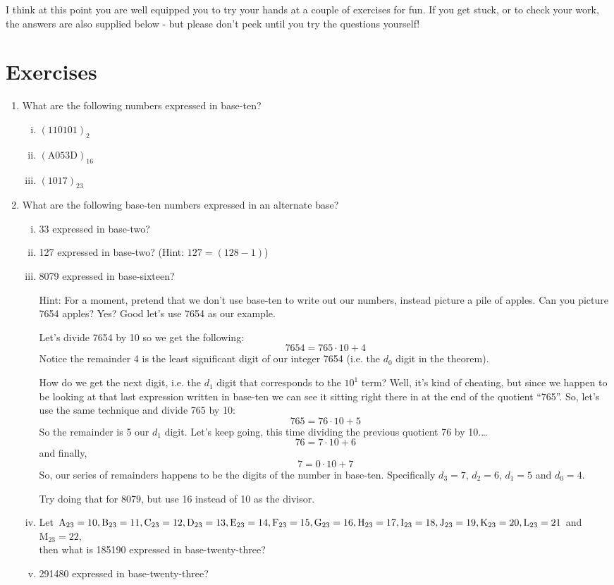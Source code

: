 \documentclass{article}
\begin{document}
I think at this point you are well equipped you to try
your hands at a couple of exercises for fun. If you get stuck, or to
check your work, the
answers are also supplied below - but please don't peek until you try the questions yourself!

\section*{Exercises}
\begin{enumerate}
\item What are the following numbers expressed in base-ten?
\begin{enumerate}[i)]
\item $(110101)_2$
\item $(\text{A}053\text{D})_{16}$
\item $(1017)_{23}$
\end{enumerate}
\item What are the following base-ten numbers expressed in an alternate base?
\begin{enumerate}[i)]
\item 33 expressed in base-two?
\item 127 expressed in base-two? (Hint: $127 = (128-1)$)
\item 8079 expressed in base-sixteen?

Hint: For a moment, pretend that we don't use base-ten to
write out our numbers, instead picture a pile of apples.
Can you picture 7654 apples?  Yes?  Good let's use 7654 as our example.

Let's divide 7654 by 10 so we get the following:
\[7654 = 765\cdot{}10+4\]
Notice the remainder 4 is the least significant digit of our
integer 7654  (i.e. the $d_0$ digit in the theorem).

How do we get the next digit, i.e. the $d_1$ digit that corresponds to the $10^1$ term? Well, it’s kind of cheating, but
since we happen to be looking at that last expression written in
base-ten we can see it sitting right there in at the
end of the quotient ``765''. So, let's use the same technique and divide 765 by 10:
\[765 = 76\cdot{}10+5\]
So the remainder is 5 our $d_1$ digit.  Let's keep going, this time dividing the previous quotient 76 by 10.\dots	
\[76 = 7\cdot{}10+6\]
and finally,
\[7= 0\cdot{}10+7\]
So, our series of remainders happens to be the digits of the number in base-ten.
Specifically $d_3 = 7$, $d_2=6$, $d_1=5$ and $d_0=4$.

Try doing that for 8079, but use 16 instead of 10 as the divisor.
\item Let $\text{A}_{23} = 10, \text{B}_{23} = 11, \text{C}_{23} = 12, \text{D}_{23} = 13, \text{E}_{23} = 14, \text{F}_{23} = 15,
\text{G}_{23} = 16,\\
\text{H}_{23} = 17, \text{I}_{23} = 18, \text{J}_{23} = 19, \text{K}_{23} = 20, \text{L}_{23} = 21$ and $\text{M}_{23} = 22$,\\
then what is 185190 expressed in base-twenty-three?
\item 291480 expressed in base-twenty-three?
\end{enumerate}

\end{enumerate}
\end{document}
